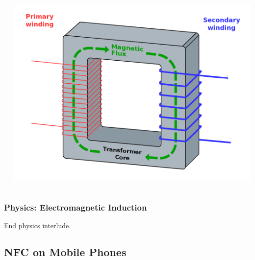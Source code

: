 \documentclass[unknownkeysallowed]{beamer}
\begin{document}
\begin{frame}
\begin{center}
\begin{minipage}{.9\textwidth}
\begin{columns}[T]
\begin{column}{.5\textwidth}
  \end{column}
    \begin{column}{.5\textwidth}
      \begin{block}{}\begin{center}
        \includegraphics[width=0.4\paperwidth]{figures/solidcore.png}
      \end{center}\end{block}
    \end{column}
  \end{columns}
  \end{minipage}\end{center}
\end{frame}
\begin{frame}
\frametitle{Physics: Electromagnetic Induction}
  \begin{center}\begin{minipage}{.9\textwidth}
     \begin{block}{End physics interlude.}
     \end{block}
  \end{minipage}\end{center}
\end{frame}



\subsection{NFC on Mobile Phones}
\end{document}
